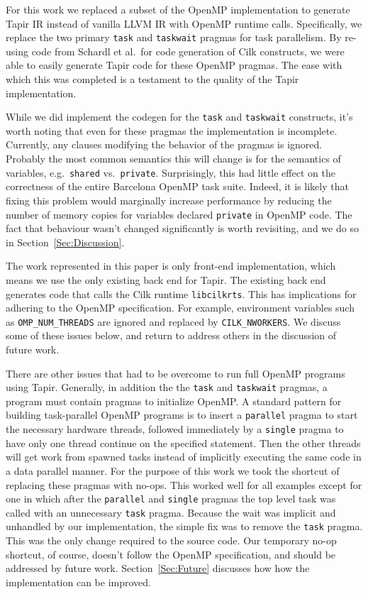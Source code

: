 \documentclass[sigconf]{acmart}
\begin{document}
For this work we replaced a subset of the OpenMP implementation to generate
Tapir IR instead of vanilla LLVM IR with OpenMP runtime calls. Specifically, we
replace the two primary \texttt{task} and \texttt{taskwait} pragmas for task
parallelism. By re-using code from Schardl et al.\ for code generation of Cilk
constructs, we were able to easily generate Tapir code for these OpenMP
pragmas. The ease with which this was completed is a testament to the quality
of the Tapir implementation. 

While we did implement the codegen for the \texttt{task} and
\texttt{taskwait} constructs, it's worth noting that even for these pragmas
the implementation is incomplete. Currently, any clauses modifying the behavior
of the pragmas is ignored. Probably the most common semantics this will change
is for the semantics of variables, e.g.\ \texttt{shared} vs.\ \texttt{private}.
Surprisingly, this had little effect on the correctness of the entire Barcelona
OpenMP task suite. Indeed, it is likely that fixing this problem would
marginally increase performance by reducing the number of memory copies for
variables declared \texttt{private} in OpenMP code.  The fact that behaviour
wasn't changed significantly is worth revisiting, and we do so in
Section~\ref{Sec:Discussion}. 

The work represented in this paper is only front-end implementation, which
means we use the only existing back end for Tapir. The existing back end
generates code that calls the Cilk runtime \texttt{libcilkrts}. This has
implications for adhering to the OpenMP specification. For example, environment
variables such as \texttt{OMP\_NUM\_THREADS} are ignored and replaced by
\texttt{CILK\_NWORKERS}.  We discuss some of these issues below, and return to
address others in the discussion of future work.

There are other issues that had to be overcome to run full OpenMP programs
using Tapir. Generally, in addition the the \texttt{task} 
and \texttt{taskwait} pragmas, a program must contain pragmas to initialize OpenMP.
A standard pattern for building task-parallel OpenMP programs is to insert a
\texttt{parallel} pragma to start the necessary hardware threads, followed
immediately by a \texttt{single} pragma to have only one thread continue on the
specified statement. Then the other threads will get work from spawned tasks
instead of implicitly executing the same code in a data parallel manner. For
the purpose of this work we took the shortcut of replacing these pragmas with
no-ops. This worked well for all examples except for one in which after the
\texttt{parallel} and \texttt{single} pragmas the top level task was called
with an unnecessary \texttt{task} pragma.  Because the wait was implicit and
unhandled by our implementation, the simple fix was to remove the \texttt{task}
pragma. This was the only change required to the source code. Our temporary
no-op shortcut, of course, doesn't follow the OpenMP specification, and should
be addressed by future work. Section~\ref{Sec:Future} discusses how how the
implementation can be improved.
\end{document}
